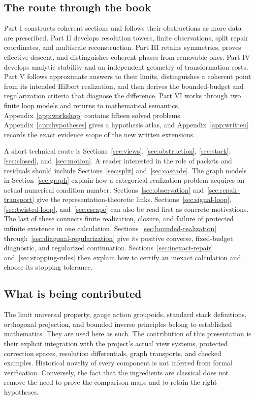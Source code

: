 \documentclass[11pt]{article}
\begin{document}
\subsection*{The route through the book}
Part I constructs coherent sections and follows their obstructions as more data are prescribed. Part II develops resolution towers, finite observations, split repair coordinates, and multiscale reconstruction. Part III retains symmetries, proves effective descent, and distinguishes coherent phases from removable ones. Part IV develops analytic stability and an independent geometry of transformation costs. Part V follows approximate answers to their limits, distinguishes a coherent point from its intended Hilbert realization, and then derives the bounded-budget and regularization criteria that diagnose the difference. Part VI works through two finite loop models and returns to mathematical semantics. Appendix~\ref{app:workshop} contains fifteen solved problems. Appendix~\ref{app:hypotheses} gives a hypothesis atlas, and Appendix~\ref{app:written} records the exact evidence scope of the new written extensions.

A short technical route is Sections~\ref{sec:views}, \ref{sec:obstruction}, \ref{sec:stack}, \ref{sec:closed}, and~\ref{sec:motion}. A reader interested in the role of packets and residuals should include Sections~\ref{sec:split} and~\ref{sec:cascade}. The graph models in Section~\ref{sec:graph} explain how a categorical realization problem acquires an actual numerical condition number. Sections~\ref{sec:observation} and~\ref{sec:repair-transport} give the representation-theoretic links. Sections~\ref{sec:signal-loop}, \ref{sec:twisted-loop}, and~\ref{sec:escape} can also be read first as concrete motivations. The last of these connects finite realization, closure, and failure of protected infinite existence in one calculation. Sections~\ref{sec:bounded-realization} through~\ref{sec:diagonal-regularization} give its positive converse, fixed-budget diagnostic, and regularized continuation. Sections~\ref{sec:inexact-repair} and~\ref{sec:stopping-rules} then explain how to certify an inexact calculation and choose its stopping tolerance.

\subsection*{What is being contributed}
The limit universal property, gauge action groupoids, standard stack definitions, orthogonal projection, and bounded inverse principles belong to established mathematics. They are used here as such. The contribution of this presentation is their explicit integration with the project's actual view systems, protected correction spaces, resolution differentials, graph transports, and checked examples. Historical novelty of every component is not inferred from formal verification. Conversely, the fact that the ingredients are classical does not remove the need to prove the comparison maps and to retain the right hypotheses.
\end{document}
